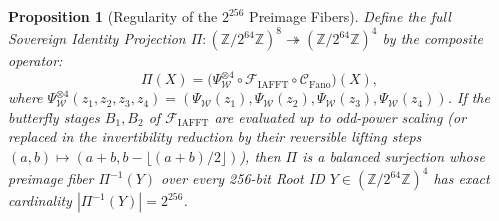 \documentclass[11pt, a4paper]{article}
\newtheorem{proposition}[theorem]{Proposition}
\begin{document}
\begin{proposition}[Regularity of the $2^{256}$ Preimage Fibers]
\label{prop:fiber_regularity}
Define the full Sovereign Identity Projection $\Pi : (\mathbb{Z}/2^{64}\mathbb{Z})^8 \twoheadrightarrow (\mathbb{Z}/2^{64}\mathbb{Z})^4$ by the composite operator:
\[
\Pi(X) = \bigl(\Psi_{\mathcal{W}}^{\otimes 4} \circ \mathcal{F}_{\mathrm{IAFFT}} \circ \mathcal{C}_{\mathrm{Fano}}\bigr)(X),
\]
where $\Psi_{\mathcal{W}}^{\otimes 4}(z_1, z_2, z_3, z_4) = (\Psi_{\mathcal{W}}(z_1), \Psi_{\mathcal{W}}(z_2), \Psi_{\mathcal{W}}(z_3), \Psi_{\mathcal{W}}(z_4))$. If the butterfly stages $B_1, B_2$ of $\mathcal{F}_{\mathrm{IAFFT}}$ are evaluated up to odd-power scaling (or replaced in the invertibility reduction by their reversible lifting steps $(a, b) \mapsto (a + b, b - \lfloor(a+b)/2\rfloor)$), then $\Pi$ is a balanced surjection whose preimage fiber $\Pi^{-1}(Y)$ over every 256-bit Root ID $Y \in (\mathbb{Z}/2^{64}\mathbb{Z})^4$ has exact cardinality $|\Pi^{-1}(Y)| = 2^{256}$.
\end{proposition}
\end{document}
